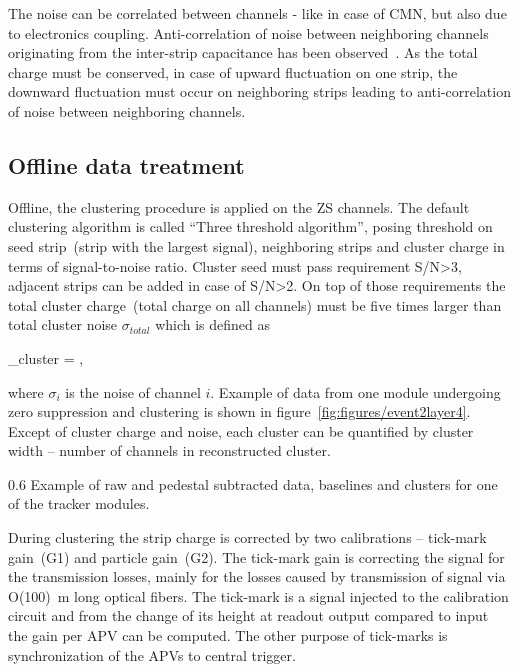 The noise can be correlated between channels - like in case of CMN, but also due to electronics coupling. Anti-correlation of noise between neighboring channels originating from the inter-strip capacitance has been observed~\cite{Lutz:1987wd}. As the total charge must be conserved, in case of upward fluctuation on one strip, the downward fluctuation must occur on neighboring strips leading to anti-correlation of noise between neighboring channels.

\subsection{Offline data treatment}


Offline, the clustering procedure is applied on the ZS channels. The default clustering algorithm is called ``Three threshold algorithm'', posing threshold on seed strip~(strip with the largest signal), neighboring strips and cluster charge in terms of signal-to-noise ratio. Cluster seed must pass requirement S/N>3, adjacent strips can be added in case of S/N>2. On top of those requirements the total cluster charge~(total charge on all channels) must be five times larger than total cluster noise $\sigma_{total}$ which is defined as

{
    \sigma_{cluster} = ,
}

where $\sigma_{i}$ is the noise of channel $i$. Example of data from one module undergoing zero suppression and clustering is shown in figure~\ref{fig:figures/event2layer4}. Except of cluster charge and noise, each cluster can be quantified by cluster width -- number of channels in reconstructed cluster.

                 {0.6}       %
                 {Example of raw and pedestal subtracted data, baselines and clusters for one of the tracker modules.} %

During clustering the strip charge is corrected by two calibrations -- tick-mark gain~(G1) and particle gain~(G2). The tick-mark gain is correcting the signal for the transmission losses, mainly for the losses caused by transmission of signal via O(100)~m long optical fibers. The tick-mark is a signal injected to the calibration circuit and from the change of its height at readout output compared to input the gain per APV can be computed. The other purpose of tick-marks is synchronization of the APVs to central trigger.

